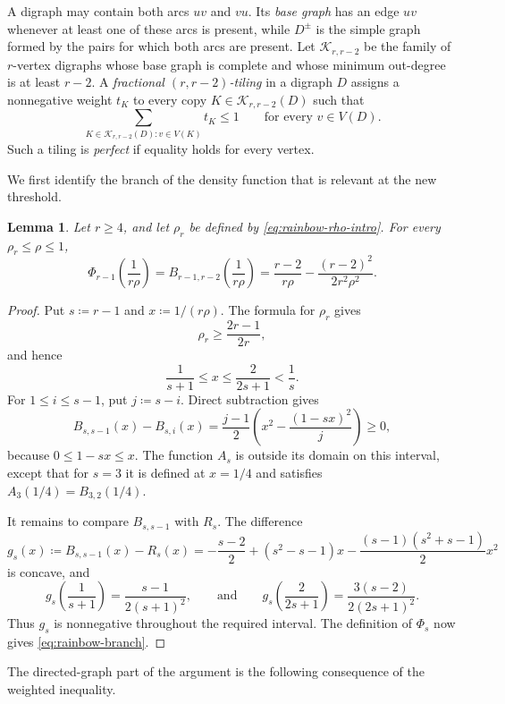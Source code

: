 \documentclass[10pt]{article}
\numberwithin{equation}{section}
\newtheorem{lemma}[lemma]{Lemma}
\begin{document}
A digraph may contain both arcs $uv$ and $vu$.  Its \emph{base graph} has an edge $uv$ whenever at least one of these arcs is present, while $D^\pm$ is the simple graph formed by the pairs for which both arcs are present.  Let $\mathcal K_{r,r-2}$ be the family of $r$-vertex digraphs whose base graph is complete and whose minimum out-degree is at least $r-2$.  A \emph{fractional $(r,r-2)$-tiling} in a digraph $D$ assigns a nonnegative weight $t_K$ to every copy $K\in\mathcal K_{r,r-2}(D)$ such that
\[
 \sum_{K\in\mathcal K_{r,r-2}(D)\colon v\in V(K)}t_K\le1
 \qquad\text{for every }v\in V(D).
\]
Such a tiling is \emph{perfect} if equality holds for every vertex.

We first identify the branch of the density function that is relevant at the new threshold.

\begin{lemma}\label{lem:rainbow-branch}
Let $r\ge4$, and let $\rho_r$ be defined by \cref{eq:rainbow-rho-intro}.  For every $\rho_r\le\rho\le1$,
\begin{equation}\label{eq:rainbow-branch}
 \Phi_{r-1}\left(\frac1{r\rho}\right)
 =B_{r-1,r-2}\left(\frac1{r\rho}\right)
 =\frac{r-2}{r\rho}-\frac{(r-2)^2}{2r^2\rho^2}.
\end{equation}
\end{lemma}

\begin{proof}
Put $s\coloneqq r-1$ and $x\coloneqq1/(r\rho)$.  The formula for $\rho_r$ gives
\[
 \rho_r\ge\frac{2r-1}{2r},
\]
and hence
\[
 \frac1{s+1}\le x\le\frac2{2s+1}<\frac1s.
\]
For $1\le i\le s-1$, put $j\coloneqq s-i$.  Direct subtraction gives
\[
 B_{s,s-1}(x)-B_{s,i}(x)
 =\frac{j-1}{2}
 \left(x^2-\frac{(1-sx)^2}{j}\right)\ge0,
\]
because $0\le1-sx\le x$.  The function $A_s$ is outside its domain on this interval, except that for $s=3$ it is defined at $x=1/4$ and satisfies $A_3(1/4)=B_{3,2}(1/4)$.

It remains to compare $B_{s,s-1}$ with $R_s$.  The difference
\[
 g_s(x)\coloneqq B_{s,s-1}(x)-R_s(x)
 =-\frac{s-2}{2}+(s^2-s-1)x-\frac{(s-1)(s^2+s-1)}2x^2
\]
is concave, and
\[
 g_s\left(\frac1{s+1}\right)=\frac{s-1}{2(s+1)^2},
 \qquad\text{and}\qquad
 g_s\left(\frac2{2s+1}\right)=\frac{3(s-2)}{2(2s+1)^2}.
\]
Thus $g_s$ is nonnegative throughout the required interval.  The definition of $\Phi_s$ now gives \cref{eq:rainbow-branch}.
\end{proof}

The directed-graph part of the argument is the following consequence of the weighted inequality.
\end{document}
